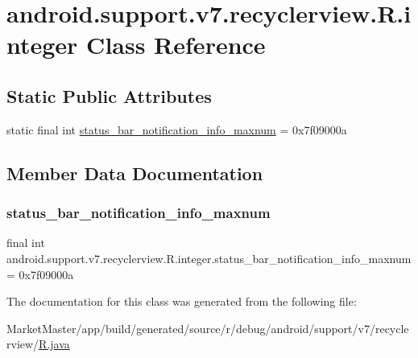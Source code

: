 \hypertarget{classandroid_1_1support_1_1v7_1_1recyclerview_1_1R_1_1integer}{}\section{android.\+support.\+v7.\+recyclerview.\+R.\+integer Class Reference}
\label{classandroid_1_1support_1_1v7_1_1recyclerview_1_1R_1_1integer}
\subsection*{Static Public Attributes}
\begin{DoxyCompactItemize}
\item 
static final int \mbox{\hyperlink{classandroid_1_1support_1_1v7_1_1recyclerview_1_1R_1_1integer_ad9015376b52984f0f7509667c0934f11}{status\+\_\+bar\+\_\+notification\+\_\+info\+\_\+maxnum}} = 0x7f09000a
\end{DoxyCompactItemize}


\subsection{Member Data Documentation}
\mbox{\label{classandroid_1_1support_1_1v7_1_1recyclerview_1_1R_1_1integer_ad9015376b52984f0f7509667c0934f11}} 
\subsubsection{\texorpdfstring{status\+\_\+bar\+\_\+notification\+\_\+info\+\_\+maxnum}{status\_bar\_notification\_info\_maxnum}}
{\footnotesize\ttfamily final int android.\+support.\+v7.\+recyclerview.\+R.\+integer.\+status\+\_\+bar\+\_\+notification\+\_\+info\+\_\+maxnum = 0x7f09000a\hspace{0.3cm}{\ttfamily [static]}}



The documentation for this class was generated from the following file\+:\begin{DoxyCompactItemize}
\item 
Market\+Master/app/build/generated/source/r/debug/android/support/v7/recyclerview/\mbox{\hyperlink{debug_2android_2support_2v7_2recyclerview_2R_8java}{R.\+java}}\end{DoxyCompactItemize}
